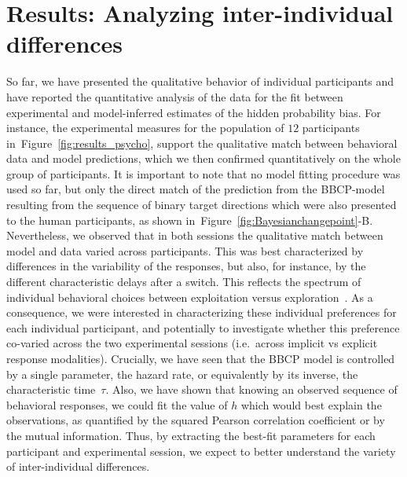 \documentclass[10pt,letterpaper]{article}
\newcommand{\citep}[1]{\cite{#1}}
\newcommand{\seeFig}[1]{Figure~\ref{fig:#1}}
\begin{document}
\section*{Results: Analyzing inter-individual differences}
\label{sec:inter}
So far, we have presented the qualitative behavior of individual participants and
have reported the quantitative analysis of the data
for the fit between experimental and model-inferred estimates of the hidden probability bias.
For instance, the experimental measures for the population of $12$ participants in~\seeFig{results_psycho},
support the qualitative match between behavioral data and model predictions,
which we then confirmed quantitatively on the whole group of participants.
It is important to note that no model fitting procedure was used so far,
but only the direct match of the prediction from the BBCP-model
resulting from the sequence of binary target directions
which were also presented to the human participants,
as shown in~\seeFig{Bayesianchangepoint}-B.
Nevertheless, we observed that in both sessions the qualitative match between model and data varied across participants.
This was best characterized by differences
in the variability of the responses, but also, for instance,
by the different characteristic delays after a switch.
This reflects the spectrum of individual behavioral choices
between exploitation versus exploration~\citep{Behrens07}.
As a consequence, we were interested in characterizing these individual preferences
for each individual participant,
and potentially to investigate whether this preference co-varied
across the two experimental sessions (i.e.~across implicit vs explicit response modalities).
Crucially, we have seen that the BBCP model is controlled by a single parameter,
the hazard rate, or equivalently by its inverse, the characteristic time~$\tau$.
Also, we have shown that knowing an observed sequence of behavioral responses,
we could fit the value of $h$ which would best explain the observations,
as quantified by the squared Pearson correlation coefficient or by the mutual information.
Thus, by extracting the best-fit parameters for each participant and experimental session,
we expect to better understand the variety of inter-individual differences. %
\end{document}
